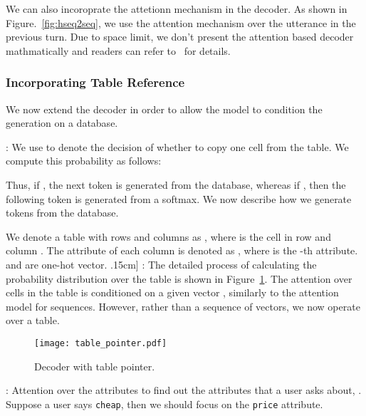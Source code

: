 \documentclass[11pt,letterpaper]{article}
\begin{document}
We can also incoroprate the attetionn mechanism in the decoder. 
As shown in Figure.~\ref{fig:hseq2seq}, we use the attention mechanism 
over the utterance in the previous turn. Due to space limit, 
we don't present the attention based decoder mathmatically and readers can refer
to~\cite{BahdanauCB14} for details.























\subsubsection{Incorporating Table Reference}
We now extend the decoder in order to allow the model to condition 
the generation on a database. 

: We use  to denote the
decision of whether to copy one cell from the table. We compute this
probability as follows:

Thus, if , the next token  is generated from the
database, whereas if , then the following token is generated from
a softmax. We now describe how we generate tokens from the database.

We denote a table with  rows and  columns as
, where  is the cell in row
 and column . The attribute of each column is denoted as , where 
is the -th attribute.  and  are one-hot vector.
\0.15cm]
: The detailed process of calculating the
probability distribution over the table is shown in
Figure~\ref{fig:table_pointer}. The attention over cells in the table is
conditioned on a given vector , similarly to the attention model for
sequences. However, rather than a sequence of vectors, we now operate over a
table.

\begin{figure}[!tb]
\texttt{[image: table\_pointer.pdf]}
    \centering
    \vspace{-0.4cm}
    \caption{Decoder with table pointer.}
    \label{fig:table_pointer}
\vspace{-0.4cm}
\end{figure}

: Attention over the attributes to find out the
attributes that a user asks about, . Suppose
a user says \texttt{cheap}, then we should focus on the \texttt{price}
attribute.
\end{document}
